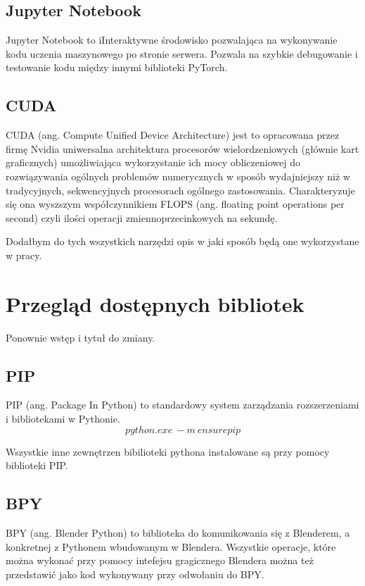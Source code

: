 \documentclass[brudnopis]{xmgr}
\begin{document}
 \section{Jupyter Notebook\label{s:dsssl}}
 
Jupyter Notebook to iInteraktywne środowisko pozwalająca na wykonywanie kodu uczenia maszynowego po stronie serwera. Pozwala na szybkie debugowanie i testowanie kodu między innymi biblioteki PyTorch.

 \section{CUDA\label{s:dsssl}}
 
CUDA (ang. Compute Unified Device Architecture) jest to opracowana przez firmę Nvidia uniwersalna architektura procesorów wielordzeniowych (głównie kart graficznych) umożliwiająca wykorzystanie ich mocy obliczeniowej do rozwiązywania ogólnych problemów numerycznych w sposób wydajniejszy niż w tradycyjnych, sekwencyjnych procesorach ogólnego zastosowania. Charakteryzuje się ona wyszszym współczynnikiem FLOPS (ang. floating point operations per second) czyli ilości operacji zmiennoprzecinkowych na sekundę.

Dodałbym do tych wszystkich narzędzi opis w jaki sposób będą one wykorzystane w pracy.


\chapter{Przegląd dostępnych bibliotek}

Ponownie wstęp i tytuł do zmiany.

 \section{PIP\label{s:dsssl}}
 PIP (ang. Package In Python) to standardowy system zarządzania rozszerzeniami i bibliotekami w Pythonie.
 \begin{equation}
python.exe\:-m\:ensurepip
\end{equation}

Wszystkie inne zewnętrzen bibilioteki pythona instalowane są przy pomocy biblioteki PIP.
 
  \section{BPY\label{s:dsssl}}
  
  BPY (ang. Blender Python) to biblioteka do komunikowania się z Blenderem, a konkretnej z Pythonem wbudowanym w Blendera. Wszystkie operacje, które można wykonać przy pomocy intefejsu gragicznego Blendera można też przedstawić jako kod wykonywany przy odwołaniu do BPY.
  
\end{document}

